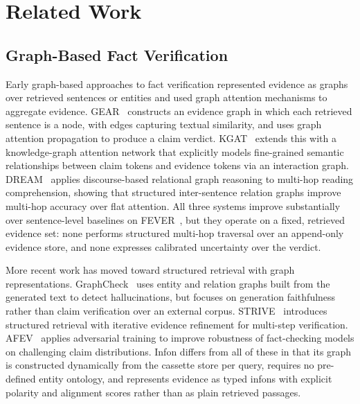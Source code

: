 \section{Related Work}
\label{sec:related_work}

\subsection{Graph-Based Fact Verification}
\label{sec:related_work:graph}

Early graph-based approaches to fact verification represented evidence as
graphs over retrieved sentences or entities and used graph attention
mechanisms to aggregate evidence.  GEAR~\cite{zhou2019gear} constructs an
evidence graph in which each retrieved sentence is a node, with edges
capturing textual similarity, and uses graph attention propagation to
produce a claim verdict.  KGAT~\cite{liu2020kgat} extends this with a
knowledge-graph attention network that explicitly models fine-grained
semantic relationships between claim tokens and evidence tokens via an
interaction graph.  DREAM~\cite{zheng2020dream} applies discourse-based
relational graph reasoning to multi-hop reading comprehension, showing that
structured inter-sentence relation graphs improve multi-hop accuracy over
flat attention.  All three systems improve substantially over sentence-level
baselines on FEVER~\cite{thorne2018fever}, but they operate on a fixed,
retrieved evidence set: none performs structured multi-hop traversal over an
append-only evidence store, and none expresses calibrated uncertainty over
the verdict.

More recent work has moved toward structured retrieval with graph
representations.  GraphCheck~\cite{guo2024graphcheck} uses entity and
relation graphs built from the generated text to detect hallucinations, but
focuses on generation faithfulness rather than claim verification over an
external corpus.  STRIVE~\cite{pan2023strive} introduces structured
retrieval with iterative evidence refinement for multi-step verification.
AFEV~\cite{hu2023afev} applies adversarial training to improve robustness
of fact-checking models on challenging claim distributions.  Infon
differs from all of these in that its graph is constructed dynamically from
the cassette store per query, requires no pre-defined entity ontology, and
represents evidence as typed infons with explicit polarity and alignment
scores rather than as plain retrieved passages.

